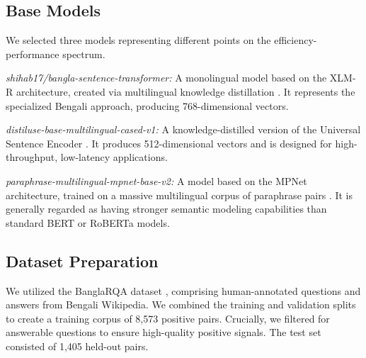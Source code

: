 \documentclass[manuscript,screen,review]{acmart}
\begin{document}
\subsection{Base Models}
We selected three models representing different points on the efficiency-performance spectrum.

\textit{shihab17/bangla-sentence-transformer:} A monolingual model based on the XLM-R architecture, created via multilingual knowledge distillation \cite{uddin2024bangla}. It represents the specialized Bengali approach, producing 768-dimensional vectors.

\textit{distiluse-base-multilingual-cased-v1:} A knowledge-distilled version of the Universal Sentence Encoder \cite{reimers2019sentencebert}. It produces 512-dimensional vectors and is designed for high-throughput, low-latency applications.

\textit{paraphrase-multilingual-mpnet-base-v2:} A model based on the MPNet architecture, trained on a massive multilingual corpus of paraphrase pairs \cite{reimers2019sentencebert}. It is generally regarded as having stronger semantic modeling capabilities than standard BERT or RoBERTa models.

\subsection{Dataset Preparation}
We utilized the BanglaRQA dataset \cite{ekram2022banglarqa}, comprising human-annotated questions and answers from Bengali Wikipedia. We combined the training and validation splits to create a training corpus of 8,573 positive pairs. Crucially, we filtered for answerable questions to ensure high-quality positive signals. The test set consisted of 1,405 held-out pairs.
\end{document}
